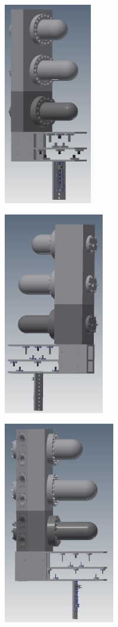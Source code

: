 \begin{figure}[h]
    \centering
    \begin{subfigure}[t]{0.3\textwidth}
        \centering
        \includegraphics[height=3.5in]{chap3/target1.jpg}
        \label{fig:target_ladder1}
    \end{subfigure}
    \hfill
    \begin{subfigure}[t]{0.3\textwidth}
        \centering
        \includegraphics[height=3.5in]{chap3/target2.jpg}
        \label{fig:target_ladder2}
    \end{subfigure}
    \hfill
    \begin{subfigure}[t]{0.3\textwidth}
        \centering
        \includegraphics[height=3.5in]{chap3/target3.jpg}

\end{subfigure}
\end{figure}
